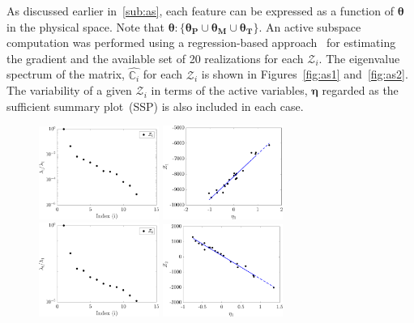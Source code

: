 As discussed earlier in~\ref{sub:as}, each feature can be expressed as a function of $\bm{\theta}$ in the physical
space. Note that $\bm{\theta}:\{\bm{\theta_P}\cup\bm{\theta_M}\cup\bm{\theta_T}\}$. An active subspace computation
was performed using a regression-based approach~\cite{Constantine:2015, Vohra:2019}
for estimating the gradient and the available set of 20 realizations for each $\mathcal{Z}_i$. 
The eigenvalue spectrum of the matrix, $\hat{\mathbb{C}_i}$ for each $\mathcal{Z}_i$ is shown in Figures~\ref{fig:as1}
and~\ref{fig:as2}.
The variability of a given $\mathcal{Z}_i$ in terms of the active variables, $\bm{\eta}$ regarded as the sufficient summary
plot~(SSP) is also included in each case.
%
\begin{figure}[htbp]
\begin{center}
\includegraphics[width=0.35\textwidth]{./Figures/eig_Zf1} 
\includegraphics[width=0.35\textwidth]{./Figures/SSP_Zf1} 
\\
\includegraphics[width=0.35\textwidth]{./Figures/eig_Zf2} 
\includegraphics[width=0.35\textwidth]{./Figures/SSP_Zf2} 

\end{center}
\end{figure}
